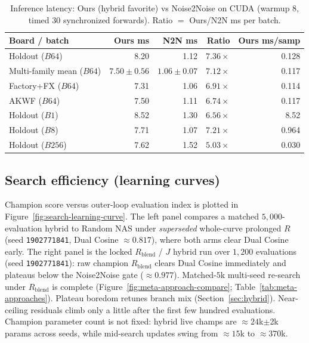 \begin{table}[t]
  \centering
  \caption{Inference latency: Ours (hybrid favorite) vs Noise2Noise on CUDA
    (warmup 8, timed 30 synchronized forwards).
    Ratio $=$ Ours/N2N ms per batch.}
  \label{tab:ours-n2n-latency}
  \footnotesize
  \setlength{\tabcolsep}{3pt}
  \begin{tabular}{@{}lrrrr@{}}
    \toprule
    Board / batch & Ours ms & N2N ms & Ratio & Ours ms/samp \\
    \midrule
    Holdout ($B64$) & 8.20 & 1.12 & $7.36\times$ & 0.128 \\
    Multi-family mean ($B64$) & $7.50{\pm}0.56$ & $1.06{\pm}0.07$ & $7.12\times$ & 0.117 \\
    Factory+FX ($B64$) & 7.31 & 1.06 & $6.91\times$ & 0.114 \\
    AKWF ($B64$) & 7.50 & 1.11 & $6.74\times$ & 0.117 \\
    \midrule
    Holdout ($B1$) & 8.52 & 1.30 & $6.56\times$ & 8.52 \\
    Holdout ($B8$) & 7.71 & 1.07 & $7.21\times$ & 0.964 \\
    Holdout ($B256$) & 7.62 & 1.52 & $5.03\times$ & 0.030 \\
    \bottomrule
  \end{tabular}
\end{table}

\subsection{Search efficiency (learning curves)}
\label{sec:search-learning-curve}
Champion score versus outer-loop evaluation index is plotted in Figure~\ref{fig:search-learning-curve}.
The left panel compares a matched $5{,}000$-evaluation hybrid to Random NAS under \emph{superseded} whole-curve prolonged $R$ (seed \texttt{1902771841}, Dual Cosine ${\approx}0.817$), where both arms clear Dual Cosine early.
The right panel is the locked $R_{\mathrm{blend}}$ / $J$ hybrid run over $1{,}200$ evaluations (seed \texttt{1902771841}):
raw champion $R_{\mathrm{blend}}$ clears Dual Cosine immediately and plateaus below the Noise2Noise gate (${\approx}0.977$).
Matched-$5$k multi-seed re-search under $R_{\mathrm{blend}}$ is complete
(Figure~\ref{fig:meta-approach-compare}; Table~\ref{tab:meta-approaches}).
Plateau boredom retunes branch mix (Section~\ref{sec:hybrid}).
Near-ceiling residuals climb only a little after the first few hundred evaluations.
Champion parameter count is not fixed: hybrid live champs are ${\approx}24$k$\pm$2k params across seeds,
while mid-search updates swing from ${\approx}15$k to ${\approx}370$k.

